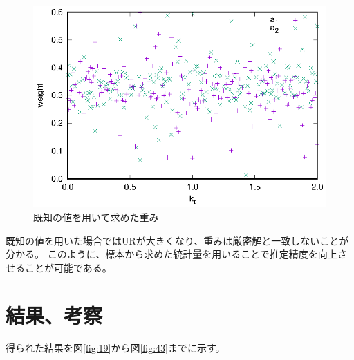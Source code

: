 \documentclass[a4paper,11pt,titlepage,uplatex]{jsreport}
\begin{document}
\begin{figure}[H]
  \centering
  \includegraphics[keepaspectratio,scale=1.0]{case1_weight2.eps}
  \caption{既知の値を用いて求めた重み}
  \label{fig:weight2}
\end{figure}

既知の値を用いた場合ではURが大きくなり、重みは厳密解と一致しないことが分かる。
このように、標本から求めた統計量を用いることで推定精度を向上させることが可能である。

\section{結果、考察}
得られた結果を図\ref{fig:19}から図\ref{fig:43}までに示す。
\end{document}
